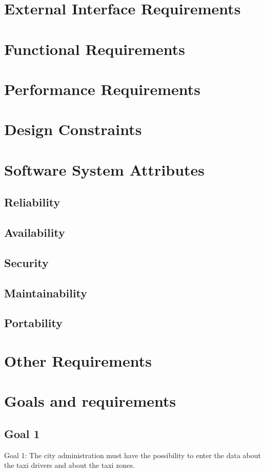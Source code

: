 \section{External Interface Requirements}
\section{Functional Requirements}
\section{Performance Requirements}
\section{Design Constraints}
\section{Software System Attributes}
\subsection{Reliability}
\subsection{Availability}
\subsection{Security}
\subsection{Maintainability}
\subsection{Portability}
\section{Other Requirements}




\section{Goals and requirements}
\subsection{Goal 1}
Goal 1: The city administration must have the possibility to enter the data about the taxi drivers and about the taxi zones. 


